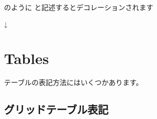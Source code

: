 \documentclass[letterpaper,10pt,dvipdfmx,openany,oneside]{sphinxmanual}
\begin{document}
のように \sphinxstylestrong{\textgreater{}\textgreater{}\textgreater{}} と記述するとデコレーションされます

↓

\begin{sphinxVerbatim}[commandchars=\\\{\}]
  
\end{sphinxVerbatim}


\section{Tables}
\label{\detokenize{1.chapter/basic_syntax:tables}}
テーブルの表記方法にはいくつかあります。


\subsection{グリッドテーブル表記}
\label{\detokenize{1.chapter/basic_syntax:id1}}
\end{document}
